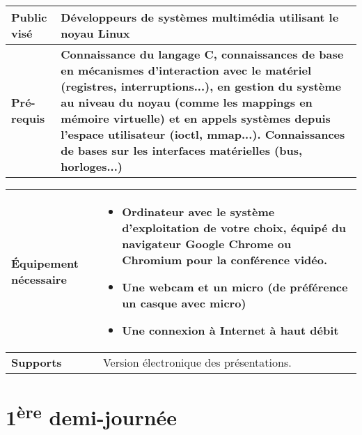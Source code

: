 \documentclass[a4paper,12pt,obeyspaces,spaces,hyphens]{article}
\begin{document}
{\begin{tabularx}{\textwidth}{|g|h|}
    {\bf Public visé} & Développeurs de systèmes multimédia utilisant le
    noyau Linux\\
    \hline

    {\bf Pré-requis} &
    {\bf Connaissance du langage C, connaissances de base en mécanismes
    d'interaction avec le matériel (registres, interruptions...),
    en gestion du système au niveau du noyau (comme les mappings en mémoire
    virtuelle) et en appels systèmes depuis l'espace utilisateur (ioctl,
    mmap...).
    Connaissances de bases sur les interfaces matérielles (bus,
    horloges...)}\\
    \hline

  \end{tabularx}

  \begin{tabularx}{\textwidth}{|g|h|}
    {\bf Équipement nécessaire} &
    \begin{itemize}
    \item Ordinateur avec le système d'exploitation de votre choix, équipé du
          navigateur Google Chrome ou Chromium pour la conférence vidéo.
    \item Une webcam et un micro (de préférence un casque avec micro)
    \item Une connexion à Internet à haut débit
    \end{itemize}\\
    \hline

    {\bf Supports} & Version électronique des présentations.\\
    \hline

\end{tabularx}}

\section{1\textsuperscript{ère} demi-journée}
\end{document}
